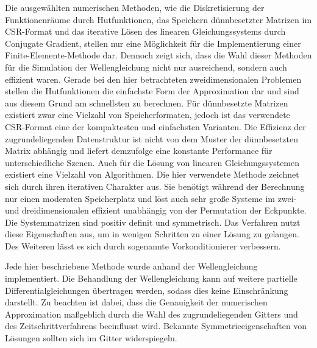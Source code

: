 \documentclass{article}
\begin{document}
    Die ausgewählten numerischen Methoden, wie die Diskretisierung der Funktionenräume durch Hutfunktionen, das Speichern dünnbesetzter Matrizen im CSR-Format und das iterative Lösen des linearen Gleichungssystems durch Conjugate Gradient, stellen nur eine Möglichkeit für die Implementierung einer Finite-Elemente-Methode dar.
    Dennoch zeigt sich, dass die Wahl dieser Methoden für die Simulation der Wellengleichung nicht nur ausreichend, sondern auch effizient waren.
    Gerade bei den hier betrachteten zweidimensionalen Problemen stellen die Hutfunktionen die einfachste Form der Approximation dar und sind aus diesem Grund am schnellsten zu berechnen.
    Für dünnbesetzte Matrizen existiert zwar eine Vielzahl von Speicherformaten, jedoch ist das verwendete CSR-Format eine der kompaktesten und einfachsten Varianten.
    Die Effizienz der zugrundeliegenden Datenstruktur ist nicht von dem Muster der dünnbesetzten Matrix abhängig und liefert demzufolge eine konstante Performance für unterschiedliche Szenen.
    Auch für die Lösung von linearen Gleichungssystemen existiert eine Vielzahl von Algorithmen.
    Die hier verwendete Methode zeichnet sich durch ihren iterativen Charakter aus.
    Sie benötigt während der Berechnung nur einen moderaten Speicherplatz und löst auch sehr große Systeme im zwei- und dreidimensionalen effizient unabhängig von der Permutation der Eckpunkte.
    Die Systemmatrizen sind positiv definit und symmetrisch.
    Das Verfahren nutzt diese Eigenschaften aus, um in wenigen Schritten zu einer Lösung zu gelangen.
    Des Weiteren lässt es sich durch sogenannte Vorkonditionierer verbessern.

    Jede hier beschriebene Methode wurde anhand der Wellengleichung implementiert.
    Die Behandlung der Wellengleichung kann auf weitere partielle Differentialgleichungen übertragen werden, sodass dies keine Einschränkung darstellt.
    Zu beachten ist dabei, dass die Genauigkeit der numerischen Approximation maßgeblich durch die Wahl des zugrundeliegenden Gitters und des Zeitschrittverfahrens beeinflusst wird.
    Bekannte Symmetrieeigenschaften von Lösungen sollten sich im Gitter widerspiegeln.
\end{document}
